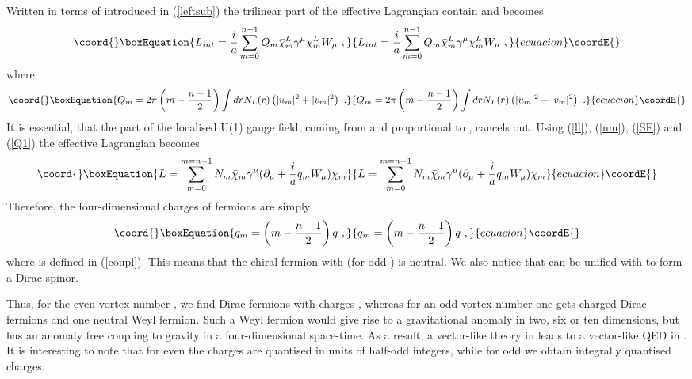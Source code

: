 \documentclass[a4paper,12pt]{article}
\begin{document}
Written in terms of \coordHE{} introduced in (\ref{leftsub})  the
trilinear part of the effective Lagrangian contain \coordHE{} and
\coordHE{} becomes 
\begin{equation}\coord{}\boxEquation{
L_{int}= \frac{i}{a}\sum_{m=0}^{n-1} 
Q_m\bar\chi_m^L\gamma^\mu \chi_m^L W_\mu~,
}{
L_{int}= \frac{i}{a}\sum_{m=0}^{n-1} 
Q_m\bar\chi_m^L\gamma^\mu \chi_m^L W_\mu~,
}{ecuacion}\coordE{}\end{equation}
where 
\begin{equation}\coord{}\boxEquation{
Q_m = 2 \pi \left(m-\frac{n-1}{2}\right)\int dr N_L(r)
\left(|u_m|^2+ |v_m|^2 \right)~.
}{
Q_m = 2 \pi \left(m-\frac{n-1}{2}\right)\int dr N_L(r)
\left(|u_m|^2+ |v_m|^2 \right)~.
}{ecuacion}\coordE{}\end{equation}
It is essential, that the part of the localised U(1) gauge field,
coming from \coordHE{} and proportional to \coordHE{}, cancels out. Using
(\ref{ll}), (\ref{nm}), (\ref{SF}) and (\ref{Q1}) 
the \coordHE{} effective Lagrangian becomes
\begin{equation}\coord{}\boxEquation{
L= \sum_{m=0} ^{m=n-1} N_m \bar\chi_m \gamma^\mu (\partial_\mu +
\frac{i}{a} q_m W_\mu)\chi_m
}{
L= \sum_{m=0} ^{m=n-1} N_m \bar\chi_m \gamma^\mu (\partial_\mu +
\frac{i}{a} q_m W_\mu)\chi_m
}{ecuacion}\coordE{}\end{equation}
 Therefore, the four-dimensional charges of fermions are simply
\begin{equation}\coord{}\boxEquation{
q_m= \left(m-\frac{n-1}{2}\right)q~,
}{
q_m= \left(m-\frac{n-1}{2}\right)q~,
}{ecuacion}\coordE{}\end{equation}
where \coordHE{} is defined in (\ref{coupl}). This means that the chiral
fermion with \coordHE{} (for odd \coordHE{}) is neutral. We also
notice that \coordHE{} can be unified with \coordHE{} to form a
Dirac spinor.

Thus, for the even vortex number \coordHE{}, we find \coordHE{} Dirac fermions
with charges \coordHE{}, whereas for an odd
vortex number \coordHE{} one gets \coordHE{} charged Dirac fermions and one
neutral Weyl fermion. Such a  Weyl fermion would give rise to a
gravitational anomaly in two, six or ten dimensions, but has an
anomaly free coupling to gravity in a four-dimensional space-time. As
a result, a vector-like theory in \coordHE{} leads to a vector-like QED in
\coordHE{}. It is interesting to note that for even \coordHE{} the charges are
quantised in units of half-odd integers, while for odd \coordHE{} we obtain
integrally quantised charges.
\end{document}
